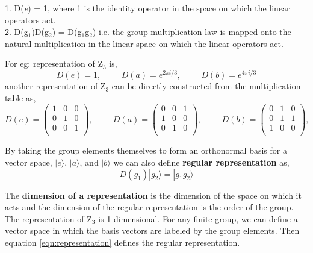 1. D(\textit{e}) = 1, where 1 is the identity operator in the space on which
the linear operators act. \\
2. D(g$_1$)D(g$_2$) = D(g$_1$g$_2$) i.e. the group multiplication law 
is mapped onto the natural multiplication in the linear space on which the linear operators act.

For eg: representation of Z$_3$ is,
\begin{equation}
    D(e) = 1, \hspace{1cm} D(a) = e^{2\pi i/3}, \hspace{1cm} D(b) = e^{4\pi i/3}
\end{equation}
another representation of Z$_3$ can be directly constructed from the multiplication table as,
\begin{equation}
    D(e) = \begin{pmatrix}
        1 & 0 & 0 \\ 
        0 & 1 & 0 \\ 
        0 & 0 & 1 \\ 
   \end{pmatrix}, \hspace{1cm} 
   D(a) = \begin{pmatrix}
        0 & 0 & 1 \\ 
        1 & 0 & 0 \\ 
        0 & 1 & 0 \\ 
   \end{pmatrix}, \hspace{1cm} 
   D(b) = \begin{pmatrix}
        0 & 1 & 0 \\ 
        0 & 1 & 1 \\ 
        1 & 0 & 0 \\ 
\end{pmatrix},
\end{equation}

By taking the group elements themselves to form an orthonormal basis for a vector space, 
$|e \rangle$, $|a\rangle$, and $|b\rangle$ we can also define \textbf{regular representation} as,
\begin{equation}
    D(g_1)|g_2\rangle = |g_1g_2\rangle
    \label{eqn:representation}
\end{equation}

The \textbf{dimension of a representation} is the dimension of the space on which
it acts and the dimension of the regular representation is the order of the group. The representation of Z$_3$ is 1 dimensional.
For any finite group, we can define a vector space in which the basis vectors are labeled by the group elements.
Then equation \ref{eqn:representation} defines the regular representation.

